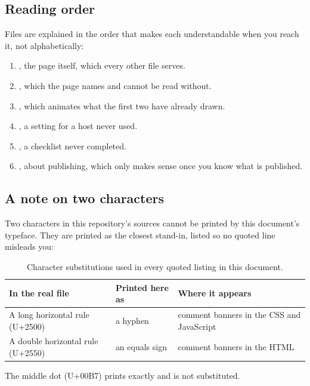 \documentclass[11pt,a4paper]{article}
\begin{document}
\subsection{Reading order}

Files are explained in the order that makes each understandable when you reach
it, not alphabetically:

\begin{enumerate}
\item {}, the page itself, which every other
  file serves.
\item {}, which the page names and cannot
  be read without.
\item {}, which animates what the first two
  have already drawn.
\item {}, a setting for a host never used.
\item {}, a checklist never completed.
\item {}, about publishing,
  which only makes sense once you know what is published.
\end{enumerate}

\subsection{A note on two characters}

Two characters in this repository's sources cannot be printed by this document's
typeface. They are printed as the closest stand-in, listed so no quoted line
misleads you:

\begin{table}[H]\centering\small
\begin{tabular}{@{}lll@{}}
\toprule
In the real file & Printed here as & Where it appears \\
\midrule
A long horizontal rule (U+2500) & a hyphen & comment banners in the CSS and JavaScript \\
A double horizontal rule (U+2550) & an equals sign & comment banners in the HTML \\
\bottomrule
\end{tabular}
\caption{Character substitutions used in every quoted listing in this document.}
\end{table}

The middle dot (U+00B7) prints exactly and is not substituted.
\end{document}

